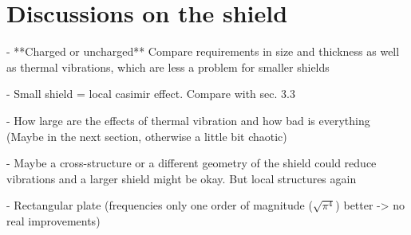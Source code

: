 \section{Discussions on the shield} \label{sec:5:discussion}

- **Charged or uncharged**
Compare requirements in size and thickness as well as thermal vibrations, which are less a problem for smaller shields

- Small shield = local casimir effect. Compare with sec. 3.3

- How large are the effects of thermal vibration and how bad is everything
(Maybe in the next section, otherwise a little bit chaotic)

- Maybe a cross-structure or a different geometry of the shield could reduce vibrations and a larger shield might be okay. But local structures again

- Rectangular plate (frequencies only one order of magnitude ($\sqrt{\pi^4}$) better -> no real improvements)